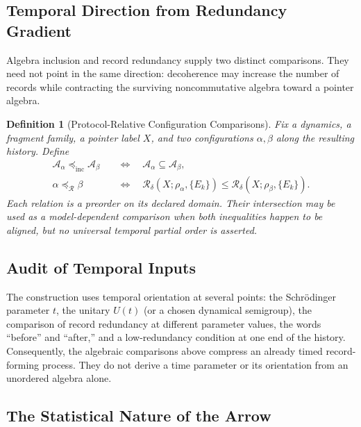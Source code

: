 \documentclass[12pt,a4paper,openany]{book}
\newtheorem{definition}[theorem]{Definition}
\begin{document}
\subsection{Temporal Direction from Redundancy Gradient}

Algebra inclusion and record redundancy supply two distinct comparisons.  They need not point in the same direction: decoherence may increase the number of records while contracting the surviving noncommutative algebra toward a pointer algebra.

\begin{definition}[Protocol-Relative Configuration Comparisons]
\label{F-def:ordering}
Fix a dynamics, a fragment family, a pointer label $X$, and two configurations $\alpha,\beta$ along the resulting history.  Define
\begin{equation}
\begin{aligned}
\mathcal{A}_\alpha \preceq_{\mathrm{inc}} \mathcal{A}_\beta
&\quad\Longleftrightarrow\quad
\mathcal{A}_\alpha\subseteq\mathcal{A}_\beta,\\
\alpha\preceq_{\mathcal R}\beta
&\quad\Longleftrightarrow\quad
\mathcal R_\delta(X;\rho_\alpha,\{E_k\})
\leq \mathcal R_\delta(X;\rho_\beta,\{E_k\}).
\end{aligned}
\end{equation}
Each relation is a preorder on its declared domain.  Their intersection may be used as a model-dependent comparison when both inequalities happen to be aligned, but no universal temporal partial order is asserted.
\end{definition}

\subsection{Audit of Temporal Inputs}

The construction uses temporal orientation at several points: the Schr\"odinger parameter $t$, the unitary $U(t)$ (or a chosen dynamical semigroup), the comparison of record redundancy at different parameter values, the words ``before'' and ``after,'' and a low-redundancy condition at one end of the history.  Consequently, the algebraic comparisons above compress an already timed record-forming process.  They do not derive a time parameter or its orientation from an unordered algebra alone.

\subsection{The Statistical Nature of the Arrow}
\end{document}
